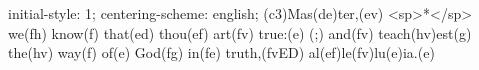 initial-style: 1;
centering-scheme: english;
(c3)Mas(de)ter,(ev) <sp>*</sp> we(fh) know(f) that(ed) thou(ef) art(fv) true:(e) (;) and(fv) teach(hv)est(g) the(hv) way(f) of(e) God(fg) in(fe) truth,(fvED) al(ef)le(fv)lu(e)ia.(e)
